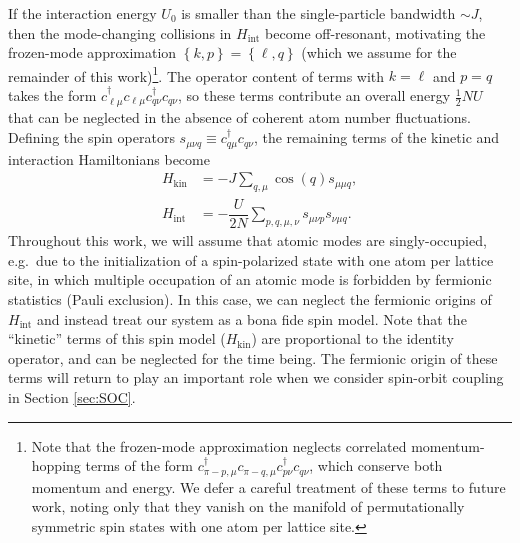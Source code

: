 \documentclass[nofootinbib,twocolumn]{revtex4-2}
\renewcommand{\t}{\text} %
\newcommand{\f}[2]{\dfrac{#1}{#2}} %
\newcommand{\p}[1]{\left(#1\right)} %
\renewcommand{\set}[1]{\left\{#1\right\}} %
\newcommand{\1}{\mathds{1}}
\begin{document}
If the interaction energy $U_0$ is smaller than the single-particle bandwidth $\sim J$, then the mode-changing collisions in $H_{\t{int}}$ become off-resonant, motivating the frozen-mode approximation $\set{k,p}=\set{\ell,q}$ (which we assume for the remainder of this work)\footnote{Note that the frozen-mode approximation neglects correlated momentum-hopping terms of the form $c_{\pi-p,\mu}^\dag c_{\pi-q,\mu} c_{p\nu}^\dag c_{q\nu}$, which conserve both momentum and energy.
We defer a careful treatment of these terms to future work, noting only that they vanish on the manifold of permutationally symmetric spin states with one atom per lattice site.}.
The operator content of terms with $k=\ell$ and $p=q$ takes the form $c_{\ell\mu}^\dag c_{\ell\mu} c_{q\nu}^\dag c_{q\nu}$, so these terms contribute an overall energy $\frac12NU$ that can be neglected in the absence of coherent atom number fluctuations.
Defining the spin operators $s_{\mu\nu q}\equiv c_{q\mu}^\dag c_{q\nu}$, the remaining terms of the kinetic and interaction Hamiltonians become
\begin{align}
  H_{\t{kin}} &= -J\sum_{q,\mu} \cos\p{q} s_{\mu\mu q},
  \label{H_kin_start} \\
  H_{\t{int}} &= -\f{U}{2N} \sum_{p,q,\mu,\nu} s_{\mu\nu p} s_{\nu\mu q}.
  \label{eq:H_int_start}
\end{align}
Throughout this work, we will assume that atomic modes are singly-occupied, e.g.~due to the initialization of a spin-polarized state with one atom per lattice site, in which multiple occupation of an atomic mode is forbidden by fermionic statistics (Pauli exclusion).
In this case, we can neglect the fermionic origins of $H_{\t{int}}$ and instead treat our system as a bona fide spin model.
Note that the ``kinetic'' terms of this spin model ($H_{\t{kin}}$) are proportional to the identity operator, and can be neglected for the time being.
The fermionic origin of these terms will return to play an important role when we consider spin-orbit coupling in Section \ref{sec:SOC}.
\end{document}
